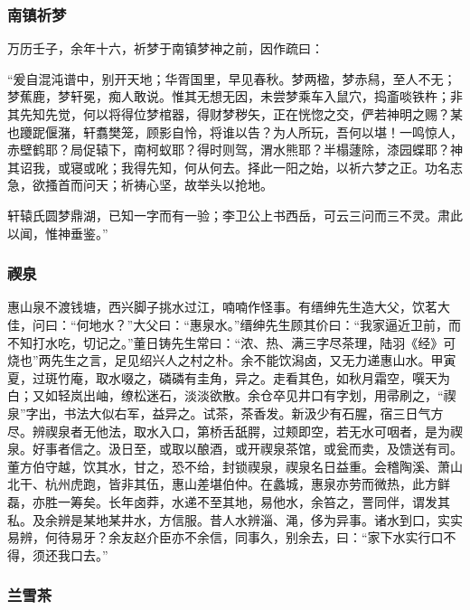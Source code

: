 \documentclass[]{article}
\begin{document}
\hypertarget{header-n191}{%
\subsubsection{南镇祈梦}\label{header-n191}}

万历壬子，余年十六，祈梦于南镇梦神之前，因作疏曰：

``爰自混沌谱中，别开天地；华胥国里，早见春秋。梦两楹，梦赤舄，至人不无；梦蕉鹿，梦轩冕，痴人敢说。惟其无想无因，未尝梦乘车入鼠穴，捣齑啖铁杵；非其先知先觉，何以将得位梦棺器，得财梦秽矢，正在恍惚之交，俨若神明之赐？某也躨跜偃潴，轩翥樊笼，顾影自怜，将谁以告？为人所玩，吾何以堪！一鸣惊人，赤壁鹤耶？局促辕下，南柯蚁耶？得时则驾，渭水熊耶？半榻蘧除，漆园蝶耶？神其诏我，或寝或吪；我得先知，何从何去。择此一阳之始，以祈六梦之正。功名志急，欲搔首而问天；祈祷心坚，故举头以抢地。

轩辕氏圆梦鼎湖，已知一字而有一验；李卫公上书西岳，可云三问而三不灵。肃此以闻，惟神垂鉴。''

\hypertarget{header-n198}{%
\subsubsection{禊泉}\label{header-n198}}

惠山泉不渡钱塘，西兴脚子挑水过江，喃喃作怪事。有缙绅先生造大父，饮茗大佳，问曰：``何地水？''大父曰：``惠泉水。''缙绅先生顾其价曰：``我家逼近卫前，而不知打水吃，切记之。''董日铸先生常曰：``浓、热、满三字尽茶理，陆羽《经》可烧也''两先生之言，足见绍兴人之村之朴。余不能饮潟卤，又无力递惠山水。甲寅夏，过斑竹庵，取水啜之，磷磷有圭角，异之。走看其色，如秋月霜空，噀天为白；又如轻岚出岫，缭松迷石，淡淡欲散。余仓卒见井口有字划，用帚刷之，``禊泉''字出，书法大似右军，益异之。试茶，茶香发。新汲少有石腥，宿三日气方尽。辨禊泉者无他法，取水入口，第桥舌舐腭，过颊即空，若无水可咽者，是为禊泉。好事者信之。汲日至，或取以酿酒，或开禊泉茶馆，或瓮而卖，及馈送有司。董方伯守越，饮其水，甘之，恐不给，封锁禊泉，禊泉名日益重。会稽陶溪、萧山北干、杭州虎跑，皆非其伍，惠山差堪伯仲。在蠡城，惠泉亦劳而微热，此方鲜磊，亦胜一筹矣。长年卤莽，水递不至其地，易他水，余笞之，詈同伴，谓发其私。及余辨是某地某井水，方信服。昔人水辨淄、渑，侈为异事。诸水到口，实实易辨，何待易牙？余友赵介臣亦不余信，同事久，别余去，曰：``家下水实行口不得，须还我口去。''

\hypertarget{header-n203}{%
\subsubsection{兰雪茶}\label{header-n203}}
\end{document}
